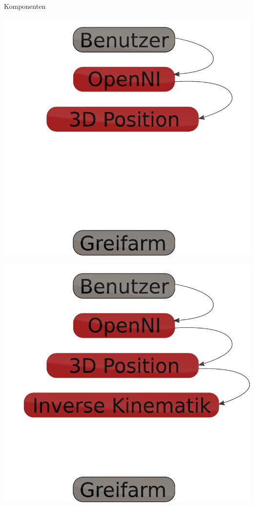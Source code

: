 \begin{frame}{Komponenten}
\begin{overprint}
 \begin{center}\includegraphics[height=0.8\textheight]{imgs/komponenten_3.pdf}\end{center}
 \begin{center}\includegraphics[height=0.8\textheight]{imgs/komponenten_4.pdf}\end{center}

\end{overprint}
\end{frame}
